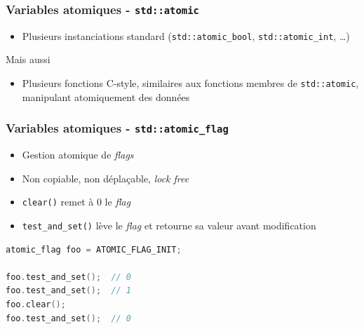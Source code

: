 \documentclass[C++.tex]{subfiles}
\begin{document}
\begin{frame}[fragile]
	\frametitle{Variables atomiques - \lstinline|std::atomic|}
	\begin{itemize}
		\item Plusieurs instanciations standard (\lstinline|std::atomic_bool|, \lstinline|std::atomic_int|, \ldots)
	\end{itemize}

	\begin{block}{Mais aussi}
		\begin{itemize}
			\item Plusieurs fonctions \og C-style\fg{}, similaires aux fonctions membres de \lstinline|std::atomic|, manipulant atomiquement des données
		\end{itemize}
	\end{block}
\end{frame}

\begin{frame}[fragile]
	\frametitle{Variables atomiques - \lstinline|std::atomic_flag|}
	\begin{itemize}
		\item Gestion atomique de \textit{flags}
		\item Non copiable, non déplaçable, \textit{lock free}
		\item \lstinline|clear()| remet à 0 le \textit{flag}
		\item \lstinline|test_and_set()| lève le \textit{flag} et retourne sa valeur avant modification
	\end{itemize}

	\begin{lstlisting}[language=C++]
atomic_flag foo = ATOMIC_FLAG_INIT;

foo.test_and_set();  // 0
foo.test_and_set();  // 1
foo.clear();
foo.test_and_set();  // 0\end{lstlisting}
\end{frame}
\end{document}
